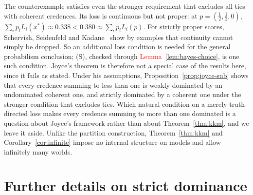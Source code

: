 \documentclass[11pt]{article}
\theoremstyle{definition}
\theoremstyle{remark}
\begin{document}
The counterexample satisfies even the stronger requirement that excludes all ties with coherent credences. Its loss is continuous but not proper: at $p=(\tfrac12,\tfrac12,0)$, $\sum_ip_iL_i(x^*)\approx0.338<0.380\approx\sum_ip_iL_i(p)$. For strictly proper scores, Schervish, Seidenfeld and Kadane~\cite{SSK09} show by examples that continuity cannot simply be dropped. So an additional loss condition is needed for the general probabilism conclusion; (S), checked through \textcolor{red}{Lemma~\ref{lem:bayes-choice}}, is one such condition. Joyce's theorem is therefore not a special case of the results here, since it fails as stated. Under his assumptions, Proposition~\ref{prop:joyce-sub} shows that every credence summing to less than one is weakly dominated by an undominated coherent one, and strictly dominated by a coherent one under the stronger condition that excludes ties. Which natural condition on a merely truth-directed loss makes every credence summing to more than one dominated is a question about Joyce's framework rather than about Theorem~\ref{thm:kkm}, and we leave it aside. Unlike the partition construction, Theorem~\ref{thm:kkm} and Corollary~\ref{cor:infinite} impose no internal structure on models and allow infinitely many worlds.

\section{Further details on strict dominance}\label{sec:strictproof}
\end{document}
